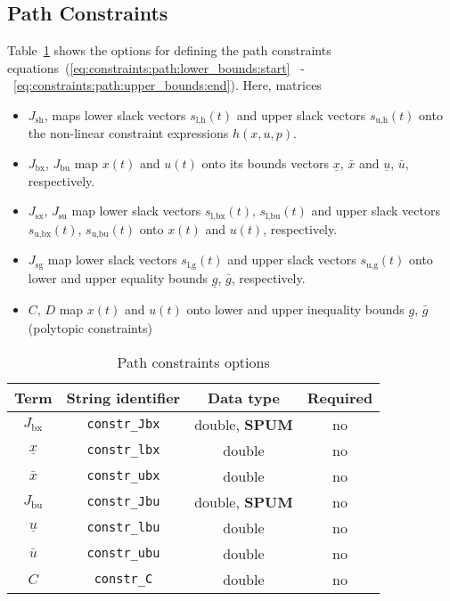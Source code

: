 \documentclass[
a4paper, %
10pt, %
notitlepage,
english]{CSUniSchoolLabReport}
\newcommand{\code}[1]{\texttt{#1}}
\newcommand{\ind}[1]{_{\textrm{#1}}}
\newcommand{\optional}{no}
\begin{document}
\begin{appendices}
\subsection{Path Constraints}\label{sec:constraints:path}
%
Table~\ref{tab:constraints:path} shows the options for defining the path constraints equations~(\ref{eq:constraints:path:lower_bounds:start} ~-~\ref{eq:constraints:path:upper_bounds:end}).
Here, matrices
\begin{itemize}
	\item $J\ind{sh}$, maps lower slack vectors $s\ind{l,h}(t)$ and upper slack vectors $s\ind{u,h}(t)$ onto the non-linear constraint expressions $h(x,u,p)$.
	\item $J\ind{bx}$, $J\ind{bu}$ map $x(t)$ and $u(t)$ onto its bounds vectors $\underline{x}$, $\bar{x}$ and $\underline{u}$, $\bar{u}$, respectively.
	\item $J\ind{sx}$, $J\ind{su}$ map lower slack vectors $s\ind{l,bx}(t)$, $s\ind{l,bu}(t)$ and upper slack vectors $s\ind{u,bx}(t)$, $s\ind{u,bu}(t)$ onto $x(t)$ and $u(t)$, respectively.
	\item $J\ind{sg}$ map lower slack vectors $s\ind{l,g}(t)$ and upper slack vectors $s\ind{u,g}(t)$ onto lower and upper equality bounds $\underline{g}$, $\bar{g}$, respectively.
	\item $C$, $D$ map $x(t)$ and $u(t)$ onto lower and upper inequality bounds $\underline{g}$, $\bar{g}$ (polytopic constraints)
\end{itemize}
%
\begin{table}[h!]
	\centering
	\caption{Path constraints options} \label{tab:constraints:path}
	\begin{tabular}{cccc}
		\toprule
		Term & String identifier & Data type & Required \\ \midrule
		$J\ind{bx}$ & \code{constr\_Jbx}    & double, \textbf{SPUM} & \optional  \\
		$\underline{x} $    & \code{constr\_lbx}     & double  & \optional  \\
		$\bar{x} $  & \code{constr\_ubx}     & double  & \optional   \\ [1em]
		$J\ind{bu}$ & \code{constr\_Jbu}    & double, \textbf{SPUM}   & \optional    \\
		$\underline{u} $    & \code{constr\_lbu}     & double   & \optional   \\
		$\bar{u} $         & \code{constr\_ubu}     & double  & \optional   \\ [1em]
		$C$ & \code{constr\_C}    & double  & \optional \\

\end{tabular}
\end{table}
\end{appendices}
\end{document}
